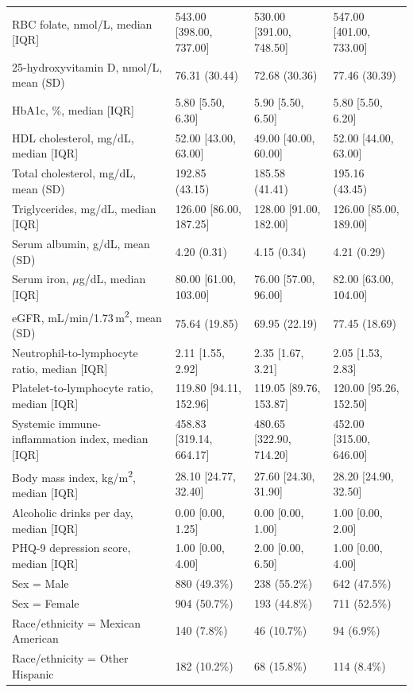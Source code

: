 \documentclass[12pt]{article}
\begin{document}
\begin{singlespace}
\begin{longtable}{L{4.6cm}R{3.35cm}R{3.35cm}R{3.35cm}}
RBC folate, nmol/L, median [IQR] & 543.00 [398.00, 737.00] & 530.00 [391.00, 748.50] & 547.00 [401.00, 733.00] \\
25-hydroxyvitamin D, nmol/L, mean (SD) & 76.31 (30.44) & 72.68 (30.36) & 77.46 (30.39) \\
HbA1c, \%, median [IQR] & 5.80 [5.50, 6.30] & 5.90 [5.50, 6.50] & 5.80 [5.50, 6.20] \\
HDL cholesterol, mg/dL, median [IQR] & 52.00 [43.00, 63.00] & 49.00 [40.00, 60.00] & 52.00 [44.00, 63.00] \\
Total cholesterol, mg/dL, mean (SD) & 192.85 (43.15) & 185.58 (41.41) & 195.16 (43.45) \\
Triglycerides, mg/dL, median [IQR] & 126.00 [86.00, 187.25] & 128.00 [91.00, 182.00] & 126.00 [85.00, 189.00] \\
Serum albumin, g/dL, mean (SD) & 4.20 (0.31) & 4.15 (0.34) & 4.21 (0.29) \\
Serum iron, $\mu$g/dL, median [IQR] & 80.00 [61.00, 103.00] & 76.00 [57.00, 96.00] & 82.00 [63.00, 104.00] \\
eGFR, mL/min/1.73\,m\textsuperscript{2}, mean (SD) & 75.64 (19.85) & 69.95 (22.19) & 77.45 (18.69) \\
Neutrophil-to-lymphocyte ratio, median [IQR] & 2.11 [1.55, 2.92] & 2.35 [1.67, 3.21] & 2.05 [1.53, 2.83] \\
Platelet-to-lymphocyte ratio, median [IQR] & 119.80 [94.11, 152.96] & 119.05 [89.76, 153.87] & 120.00 [95.26, 152.50] \\
Systemic immune-inflammation index, median [IQR] & 458.83 [319.14, 664.17] & 480.65 [322.90, 714.20] & 452.00 [315.00, 646.00] \\
Body mass index, kg/m\textsuperscript{2}, median [IQR] & 28.10 [24.77, 32.40] & 27.60 [24.30, 31.90] & 28.20 [24.90, 32.50] \\
Alcoholic drinks per day, median [IQR] & 0.00 [0.00, 1.25] & 0.00 [0.00, 1.00] & 1.00 [0.00, 2.00] \\
PHQ-9 depression score, median [IQR] & 1.00 [0.00, 4.00] & 2.00 [0.00, 6.50] & 1.00 [0.00, 4.00] \\
Sex = Male & 880 (49.3\%) & 238 (55.2\%) & 642 (47.5\%) \\
Sex = Female & 904 (50.7\%) & 193 (44.8\%) & 711 (52.5\%) \\
Race/ethnicity = Mexican American & 140 (7.8\%) & 46 (10.7\%) & 94 (6.9\%) \\
Race/ethnicity = Other Hispanic & 182 (10.2\%) & 68 (15.8\%) & 114 (8.4\%) \\

\end{longtable}
\end{singlespace}
\end{document}
